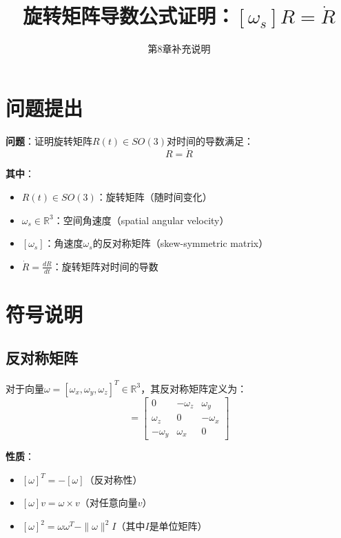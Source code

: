 \documentclass[12pt,a4paper]{article}
\title{旋转矩阵导数公式证明：$[\omega_s] R = \dot{R}$}
\author{第8章补充说明}
\date{}
\begin{document}
\maketitle

\section{问题提出}

\textbf{问题}：证明旋转矩阵$R(t) \in SO(3)$对时间的导数满足：
\begin{equation}
[\omega_s] R = \dot{R}
\end{equation}

\textbf{其中}：
\begin{itemize}
\item $R(t) \in SO(3)$：旋转矩阵（随时间变化）
\item $\omega_s \in \mathbb{R}^3$：空间角速度（spatial angular velocity）
\item $[\omega_s]$：角速度$\omega_s$的反对称矩阵（skew-symmetric matrix）
\item $\dot{R} = \frac{dR}{dt}$：旋转矩阵对时间的导数
\end{itemize}

\section{符号说明}

\subsection{反对称矩阵}

对于向量$\omega = [\omega_x, \omega_y, \omega_z]^T \in \mathbb{R}^3$，其反对称矩阵定义为：
\begin{equation}
[\omega] = \begin{bmatrix}
0 & -\omega_z & \omega_y \\
\omega_z & 0 & -\omega_x \\
-\omega_y & \omega_x & 0
\end{bmatrix}
\end{equation}

\textbf{性质}：
\begin{itemize}
\item $[\omega]^T = -[\omega]$（反对称性）
\item $[\omega] v = \omega \times v$（对任意向量$v$）
\item $[\omega]^2 = \omega \omega^T - \|\omega\|^2 I$（其中$I$是单位矩阵）
\end{itemize}
\end{document}

